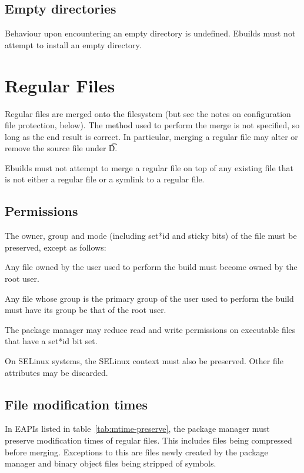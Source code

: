 \subsection{Empty directories}

Behaviour upon encountering an empty directory is undefined. Ebuilds must not attempt to install an
empty directory.

\section{Regular Files}

Regular files are merged onto the filesystem (but see the notes on configuration file protection,
below). The method used to perform the merge is not specified, so long as the end result is correct.
In particular, merging a regular file may alter or remove the source file under \t{D}.

Ebuilds must not attempt to merge a regular file on top of any existing file that is not either a
regular file or a symlink to a regular file.

\subsection{Permissions}

The owner, group and mode (including set*id and sticky bits) of the file must be preserved, except
as follows:

\begin{compactitem}
\item Any file owned by the user used to perform the build must become owned by the root user.
\item Any file whose group is the primary group of the user used to perform the build must have
    its group be that of the root user.
\item The package manager may reduce read and write permissions on executable files that have a
    set*id bit set.
\end{compactitem}

On SELinux systems, the SELinux context must also be preserved. Other
file attributes may be discarded.

\subsection{File modification times}

In EAPIs listed in table~\ref{tab:mtime-preserve}, the package manager
must preserve modification times of regular files. This includes files
being compressed before merging. Exceptions to this are files newly
created by the package manager and binary object files being stripped
of symbols.

